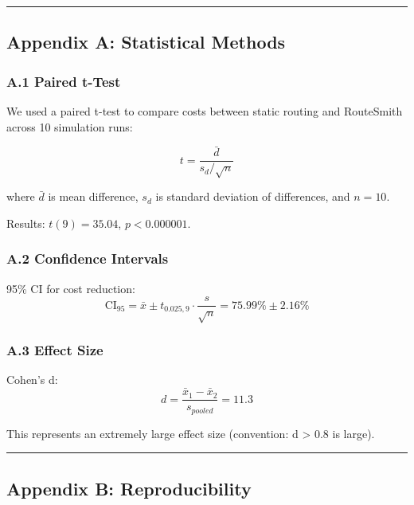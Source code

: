 \documentclass[
  11pt,
]{article}
\begin{document}
\begin{center}\rule{0.5\linewidth}{0.5pt}\end{center}

\hypertarget{appendix-a-statistical-methods}{%
\subsection{Appendix A: Statistical
Methods}\label{appendix-a-statistical-methods}}

\hypertarget{a.1-paired-t-test}{%
\subsubsection{A.1 Paired t-Test}\label{a.1-paired-t-test}}

We used a paired t-test to compare costs between static routing and
RouteSmith across 10 simulation runs:

\[t = \frac{\bar{d}}{s_d / \sqrt{n}}\]

where \(\bar{d}\) is mean difference, \(s_d\) is standard deviation of
differences, and \(n = 10\).

Results: \(t(9) = 35.04\), \(p < 0.000001\).

\hypertarget{a.2-confidence-intervals}{%
\subsubsection{A.2 Confidence
Intervals}\label{a.2-confidence-intervals}}

95\% CI for cost reduction:
\[\text{CI}_{95} = \bar{x} \pm t_{0.025, 9} \cdot \frac{s}{\sqrt{n}} = 75.99\% \pm 2.16\%\]

\hypertarget{a.3-effect-size}{%
\subsubsection{A.3 Effect Size}\label{a.3-effect-size}}

Cohen's d: \[d = \frac{\bar{x}_1 - \bar{x}_2}{s_{pooled}} = 11.3\]

This represents an extremely large effect size (convention: d
\textgreater{} 0.8 is large).

\begin{center}\rule{0.5\linewidth}{0.5pt}\end{center}

\hypertarget{appendix-b-reproducibility}{%
\subsection{Appendix B:
Reproducibility}\label{appendix-b-reproducibility}}
\end{document}
